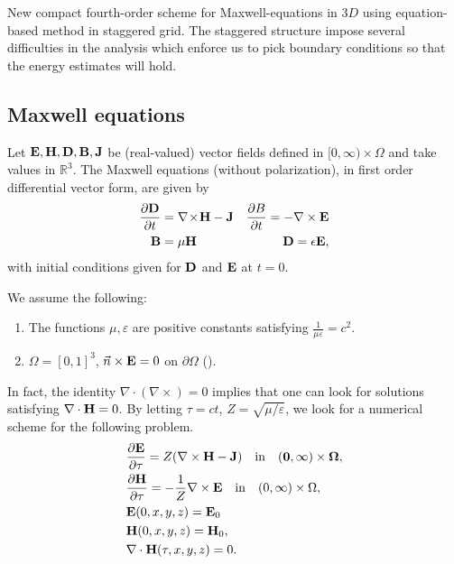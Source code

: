 \documentclass[12pt,reqno]{amsart}
\newcommand{\R}{\mathbb{R}}
\newcommand{\e}{{\bf E}}
\newcommand{\h}{{\bf H}}
\theoremstyle{definition}
\numberwithin{equation}{section}
\begin{document}
	New compact fourth-order scheme for Maxwell-equations in $3D$ using equation-based method in staggered grid.
	The staggered structure impose several difficulties in the analysis which enforce us to pick boundary conditions so that the energy estimates will hold.

	
	\subsection{Maxwell equations}
	Let $\e,\h,\bf{D},\bf{B},\bf{J}$ be (real-valued) vector fields defined in  $[0,\infty)\times\Omega$ and take values in $\R^3$.
	The Maxwell equations (without polarization), in first order differential vector form, are given by
	\begin{align*}
		\frac{\partial \bf{D}}{\partial t} &= \nabla \!\times\! \bf{H} - \bf{J} &
		\frac{\partial B}{\partial t}=-\nabla\times \e &\\
		\bf{B} &= \mu \bf{H} & \bf{D} = \epsilon \bf{E},
	\end{align*}
	with initial conditions given for $\bf{D}$ and $\bf{E}$ at $t=0$.

We assume the following:
\begin{enumerate}
	\item  The functions $\mu,\varepsilon$ are    positive constants satisfying $\frac{1}{\mu \varepsilon}=c^2$.
	\item  $\Omega=[0,1]^3$, $\vec{n} \times {\bf E}=0$ on $\partial \Omega$ (\cite[Section 8]{rolf}).
\end{enumerate}
In fact, the identity $\nabla\cdot (\nabla\times)=0$ implies that one can look for solutions  satisfying $\nabla\cdot \h=0$.
By letting  $ \tau=ct$,  $Z=\sqrt{\mu/\varepsilon}$, we look for a numerical scheme for the following problem.
	\begin{align}
	\label{eq:maxwellv}
	&\notag
\frac{\partial {\bf E}}{\partial \tau }=Z(\nabla \times \bf{H}-{\bf J}) \quad \mathrm{in} \quad  (0,\infty)\times \Omega,\\&\notag
 \frac{\partial {\bf H}}{\partial \tau }=-\frac{1}{Z}\nabla \times {\bf E} \quad \mathrm{in} \quad  (0,\infty)\times \Omega,\\&\notag
 \e(0,x,y,z)=\e_0 \\& \h(0,x,y,z)=\h_0,\\&\notag
	\nabla\cdot \h(\tau,x,y,z) = 0.\notag
\end{align}
\end{document}
